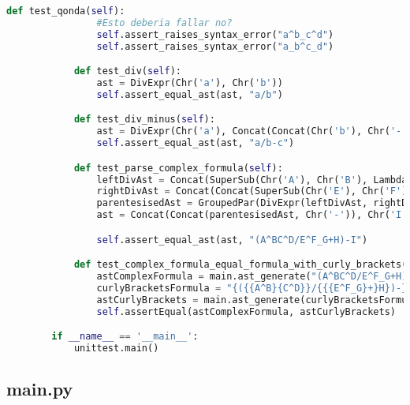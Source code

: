 \begin{lstlisting}[language=Python]
            def test_qonda(self):
                #Esto deberia fallar no?
                self.assert_raises_syntax_error("a^b_c^d")
                self.assert_raises_syntax_error("a_b^c_d")

            def test_div(self):
                ast = DivExpr(Chr('a'), Chr('b'))
                self.assert_equal_ast(ast, "a/b")

            def test_div_minus(self):
                ast = DivExpr(Chr('a'), Concat(Concat(Chr('b'), Chr('-')),Chr('c')))
                self.assert_equal_ast(ast, "a/b-c")

            def test_parse_complex_formula(self):
                leftDivAst = Concat(SuperSub(Chr('A'), Chr('B'), LambdaExpr()), SuperSub(Chr('C'), Chr('D'), LambdaExpr()))
                rightDivAst = Concat(Concat(SuperSub(Chr('E'), Chr('F'), SubSuffix(Chr('G'))), Chr('+')), Chr('H'))
                parentesisedAst = GroupedPar(DivExpr(leftDivAst, rightDivAst))
                ast = Concat(Concat(parentesisedAst, Chr('-')), Chr('I'))

                self.assert_equal_ast(ast, "(A^BC^D/E^F_G+H)-I")

            def test_complex_formula_equal_formula_with_curly_brackets(self):
                astComplexFormula = main.ast_generate("(A^BC^D/E^F_G+H)-I")
                curlyBracketsFormula = "{({{A^B}{C^D}}/{{{E^F_G}+}H})-}I"
                astCurlyBrackets = main.ast_generate(curlyBracketsFormula)
                self.assertEqual(astComplexFormula, astCurlyBrackets)

        if __name__ == '__main__':
            unittest.main()

    \end{lstlisting}


    \subsection{main.py}

